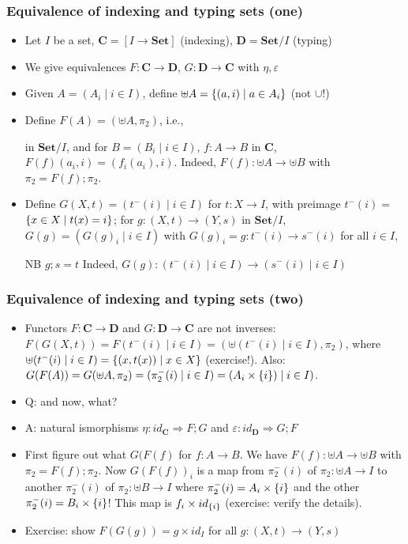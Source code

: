\documentclass[handout]{beamer}
\newcommand{\To}{\Rightarrow}
\newcommand{\bfsf}[1]{{\boldsymbol{#1}}}
\newcommand{\Set}{\bfsf{Set}}
\newcommand{\CC}{\bfsf{C}}
\newcommand{\DD}{\bfsf{D}}
\begin{document}
\frame
  {   
    \frametitle{Equivalence of indexing and typing sets (one)}\label{Ch3:Eq-ind-typ-Set}

 \begin{itemize}[<+->]
\item Let $I$ be a set, $\CC= [I\to\Set]$ (indexing), $\DD= \Set/I$ (typing)
\item We give equivalences $F: \CC\to\DD$, $G: \DD\to\CC$ with $\eta,\varepsilon$
\item Given $A = (A_i \mid i\in I)$, define $\uplus A = \{(a,i) \mid a\in A_i\}$ 
({\color{red}not} $\cup$!)
\item Define  $F(A)= (\uplus A,\pi_2)$, i.e.,
 in $\Set/I$,  %
and for  $B = (B_i \mid i\in I)$, $f  : A\to B$ in $\CC$, $F(f)(a_i,i)=(f_i(a_i),i)$.
Indeed, $F(f): \uplus A \to \uplus B$ with $\pi_2 = F(f);\pi_2$.
\item Define $G(X,t) = (t^-(i) \mid i\in I)$ for $t:X\to I$, 
with preimage $t^-(i)=$ $\{x\in X\mid t(x)=i\}$; for $g: (X,t)\to(Y\!,s)$ in $\Set/I$,
$G(g) = (G(g)_i\mid i\in I)$ with $G(g)_i = g: t^-(i) \to s^-(i)$ for all
$i\in I$,
 NB $g;s=t$
Indeed, $G(g): (t^-(i) \mid i\in I) \to (s^-(i) \mid i\in I)$
 \end{itemize}

 }

\frame
  {   
    \frametitle{Equivalence of indexing and typing sets (two)}\label{Ch3:Eq-ind-typ-ctnd}

 \begin{itemize}[<+->]
\item Functors  $F :\CC\to\DD$ and $G:\DD\to\CC$ are not inverses:
$F(G(X,t)) = F(t^-(i) \mid i\in I) = (\uplus(t^-(i) \mid i\in I),\pi_2)$,
where $\uplus(t^-(i) \mid i\in I) = \{(x,t(x)) \mid x\in X\}$ (exercise!). Also:
$G(F(A)) = G (\uplus A,\pi_2) = (\pi_2^-(i) \mid i\in I) = (A_i \times \{i\}) \mid i\in I)$. 
\item Q: and now, what?
\item A: natural ismorphisms $\eta: id_\CC \To F;G$ and $\varepsilon :  id_\DD \To G;F$
\item First figure out what $G(F(f)$ for $f:A\to B$. 
We have $F(f): \uplus A \to \uplus B$ with $\pi_2 = F(f);\pi_2$.
Now $G(F(f))_i$ is a map from $\pi_2^-(i)$ of $\pi_2 : \uplus A \to I$ to
{\color{red} another $\pi_2^-(i)$ of $\pi_2 : \uplus B \to I$}
where $\pi_2^-(i) = A_i \times \{i\}$ and
{\color{red}  the other $\pi_2^-(i)= B_i \times \{i\}$}!
This map is $f_i \times id_{\{i\}}$ (exercise: verify the details).
\item Exercise: show $F(G(g)) = g\times id_I$ for all $g: (X,t) \to (Y,s)$
 \end{itemize}

 }
\end{document}
